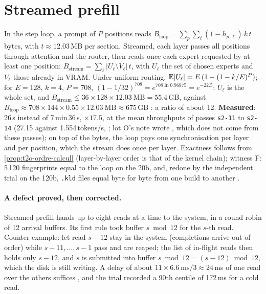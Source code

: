 \section{Streamed prefill}\label{sec:t2o-flux}

In the step loop, a prompt of $P$ positions reads $B_{\text{loop}} = \sum_p\sum_\ell (1 - h_{p,\ell})\,k\,t$ bytes, with $t \approx 12.03$\,MB per section. Streamed, each layer passes all positions through attention and the router, then reads once each expert requested by at least one position: $B_{\text{stream}} = \sum_\ell |U_\ell \setminus V_\ell|\,t$, with $U_\ell$ the set of chosen experts and $V_\ell$ those already in VRAM. Under uniform routing, $\mathbb{E}|U_\ell| = E\,(1 - (1 - k/E)^P)$; for $E = 128$, $k = 4$, $P = 708$, $(1 - 1/32)^{708} = e^{708\ln 0.96875} = e^{-22.5}$: $U_\ell$ is the whole set, and $B_{\text{stream}} \le 36 \times 128 \times 12.03~\text{MB} = 55.4$\,GB, against $B_{\text{loop}} \approx 708 \times 144 \times 0.55 \times 12.03~\text{MB} \approx 675$\,GB \calc: a ratio of about 12. \textbf{Measured}: 26\,s instead of 7\,min\,36\,s, $\times 17.5$, at the mean throughputs of passes \texttt{s2-11} to \texttt{s2-14} (27.15 against 1.554\,tokens/s, ; lot O's note wrote , which does not come from these passes); on top of the bytes, the loop pays one synchronisation per layer and per position, which the stream does once per layer. Exactness follows from \cref{prop:t2o-ordre-calcul} (layer-by-layer order is that of the kernel chain); witness F: 5\,120 fingerprints equal to the loop on the 20b, and, redone by the independent trial on the 120b, \texttt{.kld} files equal byte for byte from one build to another \mes.

\paragraph{A defect proved, then corrected.} Streamed prefill hands up to eight reads at a time to the system, in a round robin of 12 arrival buffers. Its first rule took buffer $s \bmod 12$ for the $s$-th read. Counter-example: let read $s - 12$ stay in the system (completions arrive out of order) while $s - 11, \ldots, s - 1$ pass and are reaped; the list of in-flight reads then holds only $s - 12$, and $s$ is submitted into buffer $s \bmod 12 = (s - 12) \bmod 12$, which the disk is still writing. A delay of about $11 \times 6.6~\text{ms}/3 \approx 24$\,ms of one read over the others suffices \calc, and the trial recorded a 90th centile of 172\,ms for a cold read.

